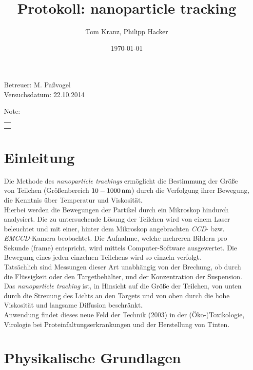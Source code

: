 \documentclass[numbers=noenddot,12pt,a4paper]{scrartcl}
\title{Protokoll: nanoparticle tracking}
\author{Tom Kranz, Philipp Hacker}
\date{\today}
\newcommand{\tilt}[1]{\textit{#1}}
\begin{document}
\maketitle
\begin{center}
Betreuer: M. Paßvogel\\
Versuchsdatum: 22.10.2014\\
\begin{table}[H]
\centering
Note:
\begin{tabularx}{1.5cm}{|X|}
\hline \\ \\
\hline
\end{tabularx}
\end{table}
\end{center}
\vspace*{\fill}
\tableofcontents
\vfill
\newpage
\section{Einleitung}
Die Methode des \tilt{nanoparticle trackings} ermöglicht die Bestimmung der Größe von Teilchen (Größenbereich $\unit[10-1000]{nm}$) durch die Verfolgung ihrer Bewegung, die Kenntnis über Temperatur und Viskosität. \\
Hierbei werden die Bewegungen der Partikel durch ein Mikroskop hindurch analysiert. Die zu untersuchende Lösung der Teilchen wird von einem Laser beleuchtet und mit einer, hinter dem Mikroskop angebrachten \tilt{CCD}- bzw. \tilt{EMCCD}-Kamera beobachtet. Die Aufnahme, welche mehreren Bildern pro Sekunde (frame) entspricht, wird mittels Computer-Software ausgewertet. Die Bewegung eines jeden einzelnen Teilchens wird so einzeln verfolgt.\\
Tatsächlich sind Messungen dieser Art unabhängig von der Brechung, ob durch die Flüssigkeit oder den Targetbehälter, und der Konzentration der Suspension. Das \tilt{nanoparticle tracking} ist, in Hinsicht auf die Größe der Teilchen, von unten durch die Streuung des Lichts an den Targets und von oben durch die hohe Viskosität und langsame Diffusion beschränkt.\\
Anwendung findet dieses neue Feld der Technik (2003) in der (Öko-)Toxikologie, Virologie bei Proteinfaltungserkrankungen und der Herstellung von Tinten.
\section{Physikalische Grundlagen}
\end{document}
